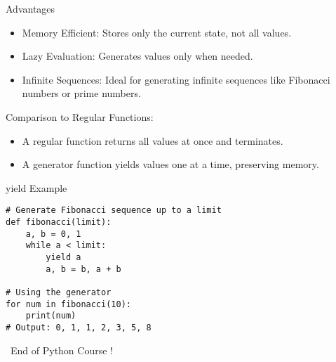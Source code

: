 \documentclass[serif, aspectratio=169]{beamer}
\begin{document}
\begin{frame}{Advantages}
    \begin{itemize}
        \item Memory Efficient: Stores only the current state, not all values.
        \item Lazy Evaluation: Generates values only when needed.
        \item Infinite Sequences: Ideal for generating infinite sequences like Fibonacci numbers or prime numbers.
    \end{itemize}
\end{frame}


\begin{frame}{Comparison to Regular Functions:}
    \begin{itemize}
         \item A regular function returns all values at once and terminates.
         \item A generator function yields values one at a time, preserving memory.
    \end{itemize}

\end{frame}
\begin{frame}[fragile]{yield Example}
    \begin{lstlisting}
# Generate Fibonacci sequence up to a limit
def fibonacci(limit):
    a, b = 0, 1
    while a < limit:
        yield a
        a, b = b, a + b

# Using the generator
for num in fibonacci(10):
    print(num)
# Output: 0, 1, 1, 2, 3, 5, 8
    \end{lstlisting}
\end{frame}

\begin{frame}
    \begin{center}
        {\Huge\ End of Python Course !}
    \end{center}
\end{frame}
\end{document}
